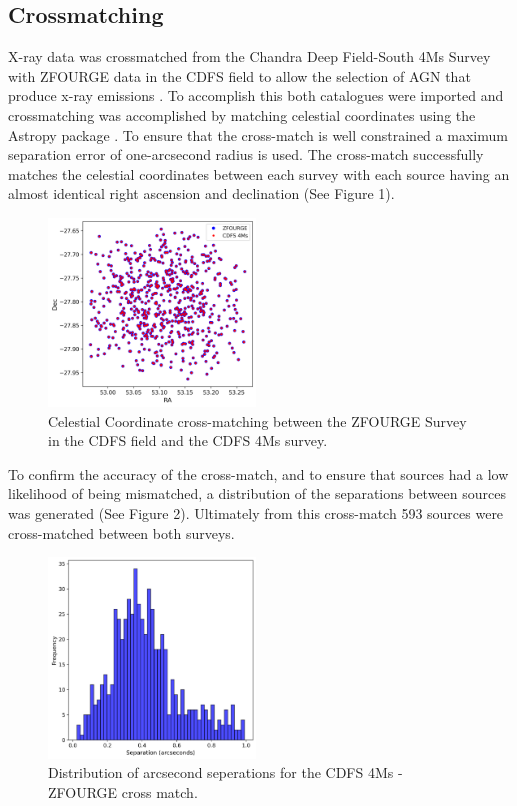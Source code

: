 \documentclass[12pt]{iopart}
\begin{document}
\subsection{Crossmatching}
X-ray data was crossmatched from the Chandra Deep Field-South 4Ms Survey \cite{xue_chandra_2011} with ZFOURGE data in the CDFS field to allow the selection of AGN that produce x-ray emissions \cite{szokoly_chandra_2004}. To accomplish this both catalogues were imported and crossmatching was accomplished by matching celestial coordinates using the Astropy package \cite{the_astropy_collaboration_astropy_2013}. To ensure that the cross-match is well constrained a maximum separation error of one-arcsecond radius is used. The cross-match successfully matches the celestial coordinates between each survey with each source having an almost identical right ascension and declination (See Figure 1).
\begin{figure}[h]
  \centering
  \includegraphics[width=0.49\textwidth]{plots/CDFS_4Ms_Xray_ZFOURGE_XMatch.png}
  \caption{Celestial Coordinate cross-matching between the ZFOURGE Survey in the CDFS field and the CDFS 4Ms survey.}
  \label{fig:Crossmatch}
\end{figure}
To confirm the accuracy of the cross-match, and to ensure that sources had a low likelihood of being mismatched, a distribution of the separations between sources was generated (See Figure 2). Ultimately from this cross-match 593 sources were cross-matched between both surveys. 
\begin{figure}[h]
  \centering
  \includegraphics[width=0.49\textwidth]{plots/CDFS_4Ms_Xray_Sep.png}
  \caption{Distribution of arcsecond seperations for the CDFS 4Ms - ZFOURGE cross match.}
  \label{fig:ArcsecondSep}
\end{figure}
\end{document}
